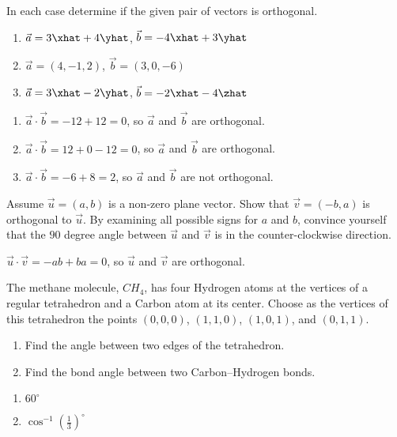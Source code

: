 \begin{exercises}
	\begin{problist}
		\prob   In each case determine if the given pair of vectors is orthogonal.
			\begin{enumerate}
				\item $\vec{a} = 3\xhat + 4\yhat$, $\vec{b} = -4\xhat + 3\yhat$
				\item $\vec{a} = (4, -1, 2)$, $\vec{b} = (3, 0, -6)$
				\item $\vec{a} = 3\xhat - 2\yhat$, $\vec{b} = -2\xhat - 4\zhat$
			\end{enumerate}
            \begin{solution}
                \begin{enumerate}
                    \item   $\vec{a} \cdot \vec{b} = -12 + 12 = 0$, so $\vec{a}$ and $\vec{b}$ are
                        orthogonal.
                    \item   $\vec{a} \cdot \vec{b} = 12 + 0 - 12 = 0$, so $\vec{a}$ and $\vec{b}$ are
                        orthogonal.
                    \item   $\vec{a} \cdot \vec{b} = -6 + 8 = 2$, so $\vec{a}$ and $\vec{b}$ are not
                        orthogonal.
                \end{enumerate}
            \end{solution}

		\prob   Assume $\vec{u} = (a, b)$ is a non-zero plane vector.  Show that $\vec{v} = (-b,
			a)$ is orthogonal to $\vec{u}$.  By examining all possible signs for $a$ and
			$b$, convince yourself that the $90$ degree angle between $\vec{u}$ and
			$\vec{v}$ is in the counter-clockwise direction.
            \begin{solution}
                $\vec{u} \cdot \vec{v} = -ab + ba = 0$, so $\vec{u}$ and $\vec{v}$ are orthogonal.
            \end{solution}

		\prob   The methane molecule, $CH_4$, has four Hydrogen atoms at the vertices of a
			regular tetrahedron and a Carbon atom at its center.  Choose as the vertices of
			this tetrahedron the points $(0,0,0)$, $(1,1,0)$, $(1,0,1)$, and $(0,1,1)$.
			\begin{enumerate}
				\item Find the angle between two edges of the tetrahedron.
				\item Find the bond angle between two Carbon--Hydrogen bonds.
			\end{enumerate}
            \begin{solution}
                \begin{enumerate}
                    \item   $60^\circ$
                    \item   $\cos^{-1}\left(\frac{1}{3}\right)^\circ$
                \end{enumerate}
            \end{solution}


\end{problist}
\end{exercises}
